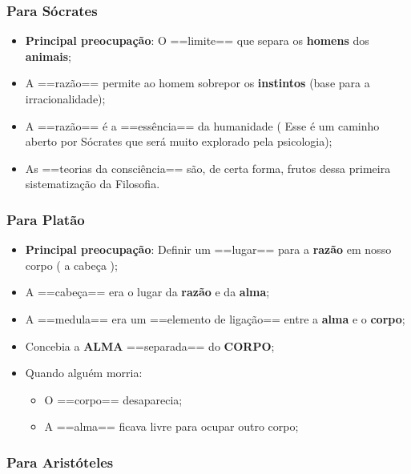 \documentclass[
]{book}
\providecommand{\tightlist}{%
  \setlength{\itemsep}{0pt}\setlength{\parskip}{0pt}}
\theoremstyle{definition}
\theoremstyle{definition}
\theoremstyle{definition}
\theoremstyle{definition}
\theoremstyle{remark}
\begin{document}
\hypertarget{para-suxf3crates}{%
\subsubsection*{Para Sócrates}\label{para-suxf3crates}}

\begin{itemize}
\tightlist
\item
  \textbf{Principal preocupação}: O ==limite== que separa os \textbf{homens} dos \textbf{animais};
\item
  A ==razão== permite ao homem sobrepor os \textbf{instintos} (base para a irracionalidade);
\item
  A ==razão== é a ==essência== da humanidade ( Esse é um caminho aberto por Sócrates que será muito explorado pela psicologia);
\item
  As ==teorias da consciência== são, de certa forma, frutos dessa primeira sistematização da Filosofia.
\end{itemize}

\hypertarget{para-platuxe3o}{%
\subsubsection*{Para Platão}\label{para-platuxe3o}}

\begin{itemize}
\tightlist
\item
  \textbf{Principal preocupação}: Definir um ==lugar== para a \textbf{razão} em nosso corpo ( a cabeça );
\item
  A ==cabeça== era o lugar da \textbf{razão} e da \textbf{alma};
\item
  A ==medula== era um ==elemento de ligação== entre a \textbf{alma} e o \textbf{corpo};
\item
  Concebia a \textbf{ALMA} ==separada== do \textbf{CORPO};
\item
  Quando alguém morria:

  \begin{itemize}
  \tightlist
  \item
    O ==corpo== desaparecia;
  \item
    A ==alma== ficava livre para ocupar outro corpo;
  \end{itemize}
\end{itemize}

\hypertarget{para-aristuxf3teles}{%
\subsubsection*{Para Aristóteles}\label{para-aristuxf3teles}}
\end{document}
